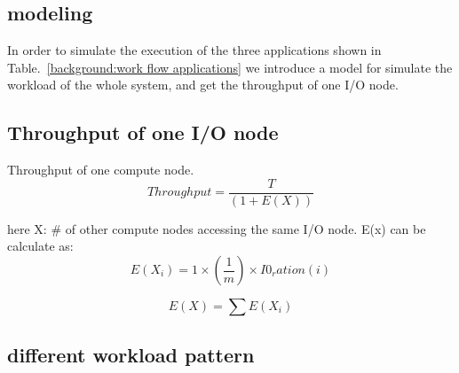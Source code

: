 \subsection{modeling}
\label{sec:modeling}

In order to simulate the execution of the three applications shown in Table.~\ref{background:work
flow applications}
we introduce a model for simulate the workload of the whole system, and get the throughput of one
I/O node.

\subsection{Throughput of one I/O node}
Throughput of one compute node.
\begin{equation}
Throughput = \frac{T}{(1 + E(X))}
\end{equation}

here X: \# of other compute nodes accessing the same I/O node.
E(x) can be calculate as:
\begin{equation}
E(X_i) = 1 \times (\frac{1}{m}) \times I0_ration(i)
\end{equation}

\begin{equation}
E(X) = \sum E(X_i)
\end{equation}

\subsection{different workload pattern}
